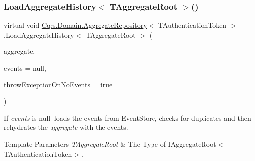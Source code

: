 \subsubsection{\texorpdfstring{Load\+Aggregate\+History$<$ T\+Aggregate\+Root $>$()}{LoadAggregateHistory< TAggregateRoot >()}}
{\footnotesize\ttfamily virtual void \hyperlink{classCqrs_1_1Domain_1_1AggregateRepository}{Cqrs.\+Domain.\+Aggregate\+Repository}$<$ T\+Authentication\+Token $>$.Load\+Aggregate\+History$<$ T\+Aggregate\+Root $>$ (\begin{DoxyParamCaption}\item[{T\+Aggregate\+Root}]{aggregate,  }\item[{I\+List$<$ \hyperlink{interfaceCqrs_1_1Events_1_1IEvent}{I\+Event}$<$ T\+Authentication\+Token $>$$>$}]{events = {\ttfamily null},  }\item[{bool}]{throw\+Exception\+On\+No\+Events = {\ttfamily true} }\end{DoxyParamCaption})\hspace{0.3cm}{\ttfamily [virtual]}}



If {\itshape events}  is null, loads the events from \hyperlink{namespaceCqrs_1_1EventStore}{Event\+Store}, checks for duplicates and then rehydrates the {\itshape aggregate}  with the events. 


\begin{DoxyTemplParams}{Template Parameters}
{\em T\+Aggregate\+Root} & The Type of I\+Aggregate\+Root$<$\+T\+Authentication\+Token$>$.\\
\hline
\end{DoxyTemplParams}

